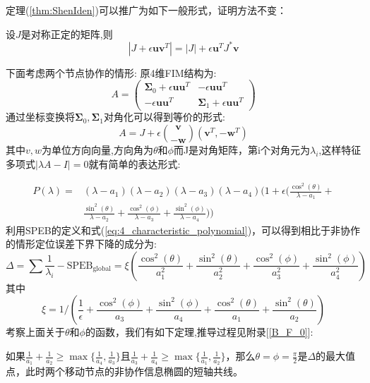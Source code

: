 定理(\ref{thm:ShenIden})可以推广为如下一般形式，证明方法不变：
\begin{corollary}设$J$是对称正定的矩阵,则
\begin{equation}
|J+\epsilon \bm{u}\bm{v}^T|=|J|+\epsilon \bm{u}^TJ^*\bm{v}
\end{equation}
\end{corollary}
下面考虑两个节点协作的情形:
原4维FIM结构为:
\begin{equation}
A=\left(\begin{array}{cc}
\bm{\Sigma}_0+\epsilon \bm{u}\bm{u}^T &-\epsilon \bm{u}\bm{u}^T \\
-\epsilon \bm{u}\bm{u}^T & \bm{\Sigma}_1+\epsilon \bm{u}\bm{u}^T
\end{array}
\right)
\end{equation}
通过坐标变换将$\bm{\Sigma}_0,\bm{\Sigma}_1$对角化可以得到等价的形式:
\begin{equation}
A=J+\epsilon\binom{\bm{v}}{-\bm{w}}(\bm{v}^T,-\bm{w}^T)
\end{equation}
其中$v,w$为单位方向向量,方向角为$\theta$和$\phi$而J是对角矩阵，第i个对角元为$\lambda_i$,这样特征多项式$|\lambda A-I|=0$就有简单的表达形式:

\begin{equation}\label{eq:4_characteristic_polynomial}
\begin{split}
P(\lambda)= &(\lambda-a_1)(\lambda-a_2)(\lambda-a_3)(\lambda-a_4)(1+\epsilon(\frac{\cos^2(\theta)}{\lambda-a_1}+\\
 &\frac{\sin^2(\theta)}{\lambda-a_2}+\frac{\cos^2(\phi)}{\lambda-a_3}+\frac{\sin^2(\phi)}{\lambda-a_4}))
\end{split}
\end{equation}
利用SPEB的定义和式(\ref{eq:4_characteristic_polynomial})，可以得到相比于非协作的情形定位误差下界下降的成分为:
\begin{equation}
\Delta=\sum \frac{1}{\lambda_i}-\text{SPEB}_{\text{global}}=\xi(\frac{\cos^2(\theta)}{a_1^2}+\frac{\sin^2(\theta)}{a_2^2}+\frac{\cos^2(\phi)}{a_3^2}+\frac{\sin^2(\phi)}{a_4^2})
\end{equation}
其中
\begin{equation}
\xi=1/(\frac{1}{\epsilon}+\frac{\cos^2(\phi)}{a_3}+\frac{\sin^2(\phi)}{a_4}+\frac{\cos^2(\theta)}{a_1}+\frac{\sin^2(\theta)}{a_2})
\end{equation}
考察上面关于$\theta$和$\phi$的函数，我们有如下定理,推导过程见附录[\ref{B_F_0}]:
\begin{theorem}
如果$\frac{1}{a_1}+\frac{1}{a_2}\geq \max\{\frac{1}{a_4},\frac{1}{a_3}\}$且$\frac{1}{a_3}+\frac{1}{a_4}\geq\max\{\frac{1}{a_1},\frac{1}{a_2}\}$，那么$\theta=\phi=\frac{\pi}{2}$是$\Delta$的最大值点，此时两个移动节点的非协作信息椭圆的短轴共线。
\end{theorem}
